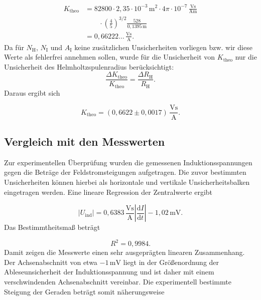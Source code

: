 \documentclass{report}
\begin{document}
\begin{align}
K_{\mathrm{theo}}
&=
82800
\cdot2{,}35\cdot10^{-3}\,\mathrm{m^2}
\cdot4\pi\cdot10^{-7}\,\mathrm{\frac{Vs}{Am}}\\
&\qquad\cdot
\left(\frac45\right)^{3/2}
\frac{528}{0{,}1395\,\mathrm m}\\
&=
0{,}66222\ldots\,\mathrm{\frac{Vs}{A}}.
\end{align}
\noindent
Da für $N_{\mathrm H}$, $N_{\mathrm I}$ und $A_{\mathrm I}$ keine zusätzlichen
Unsicherheiten vorliegen bzw. wir diese Werte als fehlerfrei annehmen sollen, wurde für die Unsicherheit von
$K_{\mathrm{theo}}$ nur die Unsicherheit des Helmholtzspulenradius
berücksichtigt:
\noindent
\begin{equation}
\frac{\Delta K_{\mathrm{theo}}}{K_{\mathrm{theo}}}
=
\frac{\Delta R_{\mathrm H}}{R_{\mathrm H}}.
\end{equation}
\noindent
Daraus ergibt sich

\begin{equation}
\boxed{
K_{\mathrm{theo}}
=
(0{,}6622\pm0{,}0017)\,
\mathrm{\frac{Vs}{A}}
}.
\end{equation}


\subsection{Vergleich mit den Messwerten}
\noindent
Zur experimentellen Überprüfung wurden die gemessenen Induktionsspannungen gegen
die Beträge der Feldstromsteigungen aufgetragen. Die zuvor bestimmten
Unsicherheiten können hierbei als horizontale und vertikale Unsicherheitsbalken
eingetragen werden.
\noindent
Eine lineare Regression der Zentralwerte ergibt

\begin{equation}
|U_{\mathrm{ind}}|
=
0{,}6383\,\mathrm{\frac{Vs}{A}}
\left|
\frac{\mathrm dI}{\mathrm dt}
\right|
-
1{,}02\,\mathrm{mV}.
\end{equation}
\noindent
Das Bestimmtheitsmaß beträgt

\begin{equation}
\boxed{
R^2=0{,}9984
}.
\end{equation}
\noindent
Damit zeigen die Messwerte einen sehr ausgeprägten linearen Zusammenhang.
Der Achsenabschnitt von etwa $-1\,\mathrm{mV}$ liegt in der Größenordnung der
Ableseunsicherheit der Induktionsspannung und ist daher mit einem verschwindenden
Achsenabschnitt vereinbar.
\noindent
Die experimentell bestimmte Steigung der Geraden beträgt somit näherungsweise
\end{document}
